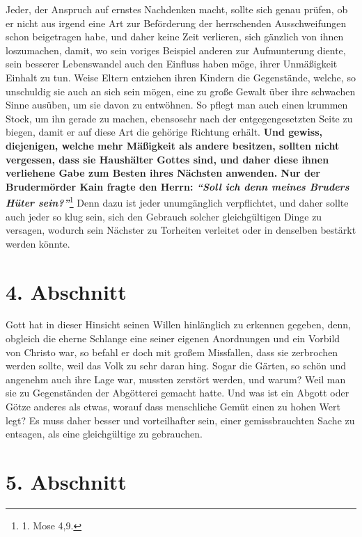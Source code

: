 Jeder, der Anspruch auf ernstes Nachdenken macht, sollte sich genau prüfen, ob
er nicht aus irgend eine Art zur Beförderung der herrschenden Ausschweifungen
schon beigetragen habe, und daher keine Zeit verlieren, sich gänzlich von ihnen
loszumachen, damit, wo sein voriges Beispiel anderen zur Aufmunterung
diente, sein besserer Lebenswandel auch den Einfluss haben möge, ihrer
Unmäßigkeit Einhalt zu tun. Weise
Eltern
entziehen ihren Kindern die
Gegenstände, welche, so unschuldig sie auch an sich sein mögen, eine zu große
Gewalt über ihre schwachen Sinne ausüben, um sie davon zu entwöhnen. So pflegt
man auch einen krummen Stock, um ihn gerade zu machen, ebensosehr nach der
entgegengesetzten Seite zu biegen, damit er auf diese Art die gehörige Richtung
erhält.  \label{ref:18_03_vorbild}\textbf{Und gewiss,
diejenigen, welche mehr
Mäßigkeit als andere besitzen,
sollten nicht vergessen, dass sie Haushälter Gottes sind, und daher diese ihnen
verliehene Gabe zum Besten ihres Nächsten anwenden. Nur der Brudermörder
Kain
fragte den Herrn:
\textit{"`Soll ich denn meines Bruders Hüter sein?"'}}\footnote{1. Mose 4,9.}
Denn dazu ist jeder unumgänglich verpflichtet, und daher sollte auch jeder
so klug sein, sich den Gebrauch solcher gleichgültigen Dinge zu versagen,
wodurch sein Nächster zu Torheiten verleitet oder in denselben bestärkt werden
könnte.

\section{4. Abschnitt} \label{kap18_ab4}

Gott hat in dieser Hinsicht seinen Willen hinlänglich zu erkennen gegeben, denn,
obgleich die eherne Schlange eine seiner eigenen Anordnungen und
ein Vorbild von
Christo war, so befahl er doch mit großem Missfallen, dass sie zerbrochen werden
sollte, weil das Volk zu sehr daran hing. Sogar die Gärten, so schön und
angenehm
auch ihre Lage war, mussten zerstört werden, und warum? Weil man sie zu
Gegenständen der Abgötterei gemacht hatte. Und was ist
ein
Abgott oder Götze
anderes als etwas, worauf dass menschliche Gemüt einen zu hohen Wert legt? Es
muss daher besser und vorteilhafter sein, einer gemissbrauchten Sache zu
entsagen, als eine gleichgültige zu gebrauchen.

\section{5. Abschnitt} \label{kap18_ab5}

